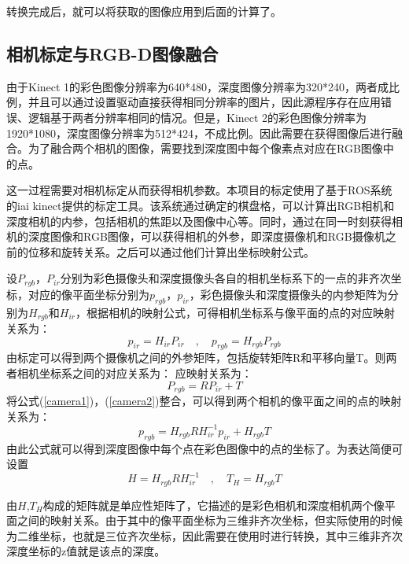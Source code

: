 转换完成后，就可以将获取的图像应用到后面的计算了。

\subsection{相机标定与RGB-D图像融合}
由于Kinect 1的彩色图像分辨率为640*480，深度图像分辨率为320*240，两者成比例，并且可以通过设置驱动直接获得相同分辨率的图片，因此源程序存在应用错误、逻辑基于两者分辨率相同的情况。但是，Kinect 2的彩色图像分辨率为1920*1080，深度图像分辨率为512*424，不成比例。因此需要在获得图像后进行融合。为了融合两个相机的图像，需要找到深度图中每个像素点对应在RGB图像中的点。

这一过程需要对相机标定从而获得相机参数。本项目的标定使用了基于ROS系统的iai kinect提供的标定工具\cite{iai_kinect2}。该系统通过确定的棋盘格，可以计算出RGB相机和深度相机的内参，包括相机的焦距以及图像中心等。同时，通过在同一时刻获得相机的深度图像和RGB图像，可以获得相机的外参，即深度摄像机和RGB摄像机之前的位移和旋转关系。之后可以通过他们计算出坐标映射公式。

设$P_{rgb}$，$P_{ir}$分别为彩色摄像头和深度摄像头各自的相机坐标系下的一点的非齐次坐标，对应的像平面坐标分别为$p_{rgb}$，$p_{ir}$，彩色摄像头和深度摄像头的内参矩阵为分别为$H_{rgb}$和$H_{ir}$，根据相机的映射公式，可得相机坐标系与像平面的点的对应映射关系为：
\begin{equation}
 p_{ir} = H_{ir}P_{ir} \quad\mathrm{,}\quad  p_{rgb} = H_{rgb}P_{rgb}\label{camera1}
\end{equation}
由标定可以得到两个摄像机之间的外参矩阵，包括旋转矩阵R和平移向量T。则两者相机坐标系之间的对应关系为：
应映射关系为：
\begin{equation}
 P_{rgb} = RP_{ir} + T \label{camera2}
\end{equation}
将公式(\ref{camera1})，(\ref{camera2})整合，可以得到两个相机的像平面之间的点的映射关系为：
\begin{equation}
 p_{rgb} = H_{rgb}RH_{ir}^{-1}p_{ir} + H_{rgb}T
\end{equation}
由此公式就可以得到深度图像中每个点在彩色图像中的点的坐标了。为表达简便可设置
\begin{equation}
 H = H_{rgb}RH_{ir}^{-1} \quad\mathrm{,}\quad T_H = H_{rgb}T
\end{equation}

由$H$,$T_H$构成的矩阵就是单应性矩阵了，它描述的是彩色相机和深度相机两个像平面之间的映射关系。由于其中的像平面坐标为三维非齐次坐标，但实际使用的时候为二维坐标，也就是三位齐次坐标，因此需要在使用时进行转换，其中三维非齐次深度坐标的z值就是该点的深度。
	
